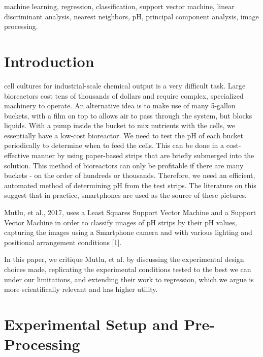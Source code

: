 \documentclass[journal]{IEEEtran}
\begin{document}
\begin{IEEEkeywords}
machine learning, regression, classification, support vector machine, linear discriminant analysis, nearest neighbors, pH, principal component analysis, image processing.
\end{IEEEkeywords}

\IEEEpeerreviewmaketitle

\section{Introduction}
 cell cultures for industrial-scale chemical output is a very difficult task. Large bioreactors cost tens of thousands of dollars and require complex, specialized machinery to operate. An alternative idea is to make use of many 5-gallon buckets, with a film on top to allows air to pass through the system, but blocks liquids. With a pump inside the bucket to mix nutrients with the cells, we essentially have a low-cost bioreactor. We need to test the pH of each bucket periodically to determine when to feed the cells. This can be done in a cost-effective manner by using paper-based strips that are briefly submerged into the solution. This method of bioreactors can only be profitable if there are many buckets - on the order of hundreds or thousands. Therefore, we need an efficient, automated method of determining pH from the test strips. The literature on this suggest that in practice, smartphones are used as the source of these pictures.

Mutlu, et al., 2017, uses a Least Squares Support Vector Machine and a Support Vector Machine in order to classify images of pH strips by their pH values, capturing the images using a Smartphone camera and with various lighting and positional arrangement conditions [1].

In this paper, we critique Mutlu, et al. by discussing the experimental design choices made, replicating the experimental conditions tested to the best we can under our limitations, and extending their work to regression, which we argue is more scientifically relevant and has higher utility.

\section{Experimental Setup and Pre-Processing}
\end{document}
